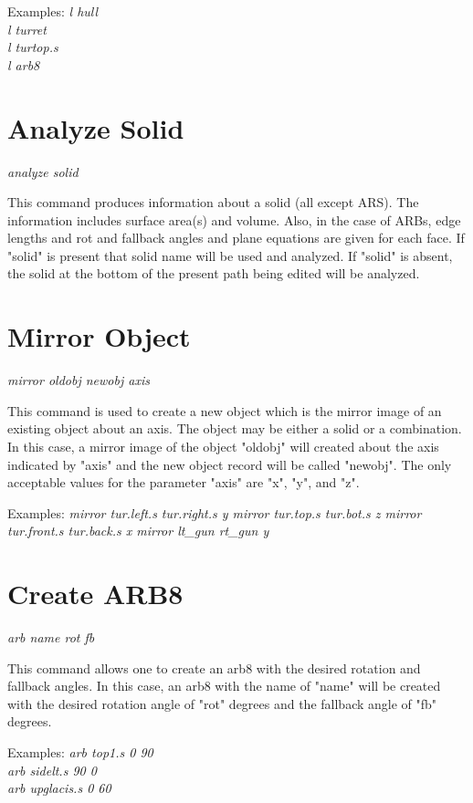 Examples:
{\em
               l hull \\
               l turret \\
               l turtop.s \\
               l arb8 \\
}

\section{Analyze Solid}

{\em \center
analyze solid
}

This command produces information about a solid (all except ARS).
The information includes surface area(s) and volume.
Also, in the case of ARBs, edge lengths and rot and fallback angles
and plane equations are given for each face.
If "solid" is present that solid name will be used and analyzed.
If "solid" is absent, the solid at the bottom of the present path
being edited will be analyzed.

\section{Mirror Object}

{\em \center
mirror oldobj newobj axis
}

This command is used to create a new object which is
the mirror image of an existing object about an axis.  
The object may be either a solid or a combination.
In this case, a mirror image of the object "oldobj" will created
about the axis indicated by "axis" and the new object record will
be called "newobj".
The only acceptable values for the parameter "axis" are "x", "y", and "z".

Examples:
{\em
              mirror tur.left.s tur.right.s y
              mirror tur.top.s tur.bot.s z
              mirror tur.front.s tur.back.s x
              mirror lt\_gun rt\_gun y
}

\section{Create ARB8}

{\em \center
arb name rot fb
}

This command allows one to create an arb8
with the desired rotation and fallback angles.
In this case, an arb8 with the name of "name" will be created with the desired
rotation angle of "rot" degrees and the fallback angle of "fb" degrees.

Examples:
{\em
           arb top1.s 0 90 \\
           arb sidelt.s 90 0 \\
           arb upglacis.s 0 60 \\
}

